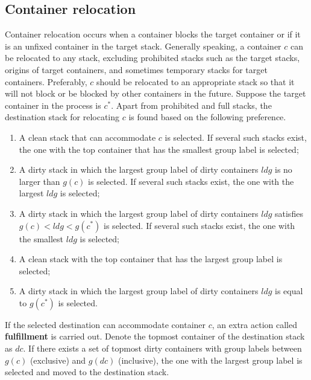 \documentclass[review,3p,times,authoryear,12pt]{elsarticle}
\begin{document}
\subsection{Container relocation}
\label{sec:rel}

Container relocation occurs when a container blocks the target container or if it is an unfixed container in the target stack.
Generally speaking, a container $c$ can be relocated to any stack, excluding prohibited stacks such as the target stacks, origins of target containers, and sometimes temporary stacks for target containers.
Preferably, $c$ should be relocated to an appropriate stack so that it will not block or be blocked by other containers in the future.
Suppose the target container in the process is $c^*$.
Apart from prohibited and full stacks, the destination stack for relocating $c$ is found based on the following preference.

\begin{enumerate}[1.]
\item A clean stack that can accommodate $c$ is selected. If several such stacks exist, the one with the top container that has the smallest group label is selected;

\item A dirty stack in which the largest group label of dirty containers $\mathit{ldg}$ is no larger than $g(c)$ is selected. If several such stacks exist, the one with the largest $\mathit{ldg}$ is selected;

\item A dirty stack in which the largest group label of dirty containers $\mathit{ldg}$ satisfies $g(c)<\mathit{ldg}<g(c^*)$ is selected. If several such stacks exist, the one with the smallest $\mathit{ldg}$ is selected;

\item A clean stack with the top container that has the largest group label is selected;

\item A dirty stack in which the largest group label of dirty containers $\mathit{ldg}$ is equal to $g(c^*)$ is selected.
\end{enumerate}


If the selected destination can accommodate container $c$, an extra action called \textbf{fulfillment} is carried out.
Denote the topmost container of the destination stack as $\mathit{dc}$.
If there exists a set of topmost dirty containers with group labels between $g(c)$ (exclusive) and $g(\mathit{dc})$ (inclusive), the one with the largest group label is selected and moved to the destination stack.
\end{document}
